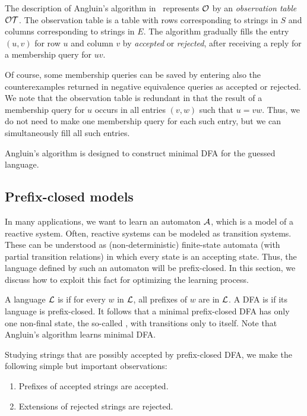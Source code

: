 The description of Angluin's algorithm in~\cite{Angluin:regset}
represents $\mathcal{O}$ by an {\em observation table}
$\mathcal{OT}$. The observation table is a table with rows corresponding
to strings in $S$ and columns corresponding to strings in $E$.  The
algorithm gradually fills the entry $(u,v)$ for row $u$ and column $v$
by {\em accepted} or {\em rejected}, after receiving a reply for a
membership query for $uv$.

Of course, some membership queries can be saved by entering also the
counterexamples returned in negative equivalence queries as accepted
or rejected.  We note that the observation table is redundant in
that the result of a membership query for $u$ occurs in all entries
$(v,w)$ such that $u = vw$. Thus, we do not need to make one
membership query for each such entry, but we can simultaneously fill
all such entries.

Angluin's algorithm is designed to construct minimal DFA for the
guessed language.

\subsection{Prefix-closed models}
\label{sect:prefix}

In many applications, we want to learn an automaton ${\cal A}$, which is
a model of a reactive system. Often, reactive systems can be modeled
as transition systems. These can be understood as (non-deterministic)
finite-state automata (with partial transition relations) in which
every state is an accepting state.  Thus, the language defined by such
an automaton will be prefix-closed. In this section, we discuss how to
exploit this fact for optimizing the learning process.

A language $\mathcal{L}$ is  if for every $w$ in $\mathcal{L}$,
all prefixes of $w$ are in $\mathcal{L}$.  A DFA is  if
its language is prefix-closed.  It follows that a minimal
prefix-closed DFA has only one non-final state, the so-called
, with transitions only to itself. Note that Angluin's
algorithm learns minimal DFA.

Studying strings that are possibly accepted by prefix-closed DFA, we
make the following simple but important observations:
\begin{enumerate}
\item \label{opt:acc} Prefixes of accepted strings are accepted.
\item \label{opt:rej} Extensions of rejected strings are rejected.
\end{enumerate}

